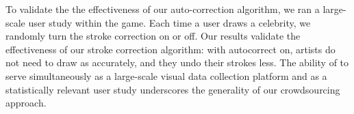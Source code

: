 To validate the the effectiveness of our auto-correction algorithm,
we ran a large-scale user study within the game. Each time a
user draws a celebrity, we randomly turn the stroke correction
on or off. Our results validate the effectiveness of our stroke
correction algorithm: with autocorrect on, artists do not need to
draw as accurately, and they undo their strokes less. The ability of
\daf to serve simultaneously as a large-scale visual data
collection platform and as a statistically relevant user study
underscores the generality of our crowdsourcing approach.




% 




%








